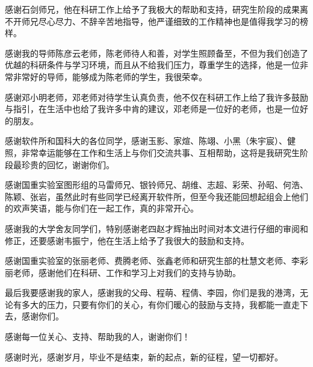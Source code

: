 感谢石剑师兄，他在科研工作上给予了我极大的帮助和支持，研究生阶段的成果离不开师兄尽心尽力、不辞辛苦地指导，他严谨细致的工作精神也是值得我学习的榜样。

感谢我的导师陈彦云老师，陈老师待人和善，对学生照顾备至，不但为我们创造了优越的科研条件与学习环境，而且从不给我们压力，尊重学生的选择，他是一位非常非常好的导师，能够成为陈老师的学生，我很荣幸。

感谢邓小明老师，邓老师对待学生认真负责，他不仅在科研工作上给了我许多鼓励与指引，在生活中也给了我许多中肯的建议，邓老师是一位好的老师，也是一位好的朋友。

感谢软件所和国科大的各位同学，感谢玉影、家煊、陈翊、小黑（朱宇宸）、健照，非常幸运能够在工作和生活上与你们交流共事、互相帮助，这将是我研究生阶段最珍贵的回忆，谢谢你们。

感谢国重实验室图形组的马雷师兄、银铃师兄、胡维、志超、彩荣、孙昭、何浩、陈颖、张岩，虽然此时有些同学已经离开软件所，但至今我还能回想起组会上他们的欢声笑语，能与你们在一起工作，真的非常开心。

感谢我的大学舍友同学们，特别感谢老四赵才辉抽出时间对本文进行仔细的审阅和修正，还要感谢韦振宁，他在生活上给予了我很大的鼓励和支持。

感谢国重实验室的张丽老师、费腾老师、张鑫老师和研究生部的杜慧文老师、李彩丽老师，感谢他们在科研、工作和学习上对我们的支持与协助。

最后我要感谢我的家人，感谢我的父母、程萌、程倩、李园，你们是我的港湾，无论有多大的压力，只要有你们的关心，有你们暖心的鼓励与支持，我都能一直走下去，感谢你们。

感谢每一位关心、支持、帮助我的人，谢谢你们！

感谢时光，感谢岁月，毕业不是结束，新的起点，新的征程，望一切都好。
